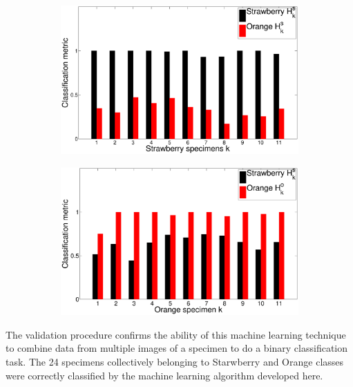 \documentclass {udthesis}
\begin{document}
%
\begin{figure}
  \centering
  \begin{subfigure}[]{0.7\textwidth}
      \includegraphics[width=\textwidth]{classification_metric_strawberry}
      \caption{}
      \label{fig:results_strawberry}
  \end{subfigure}
  \vskip -2pt
  \begin{subfigure}[]{0.7\textwidth}
      \includegraphics[width=\textwidth]{classification_metric_orange}
      \caption{}
      \label{fig:results_orange}
  \end{subfigure}
\caption[Classification results]{}
\label{fig:results}
\end{figure}	
%

The validation procedure confirms the ability of this machine learning technique to combine data from multiple images of a specimen to do a binary classification task. The 24 specimens collectively belonging to Starwberry and Orange classes were correctly classified by the machine learning algorithm developed here.
\end{document}
